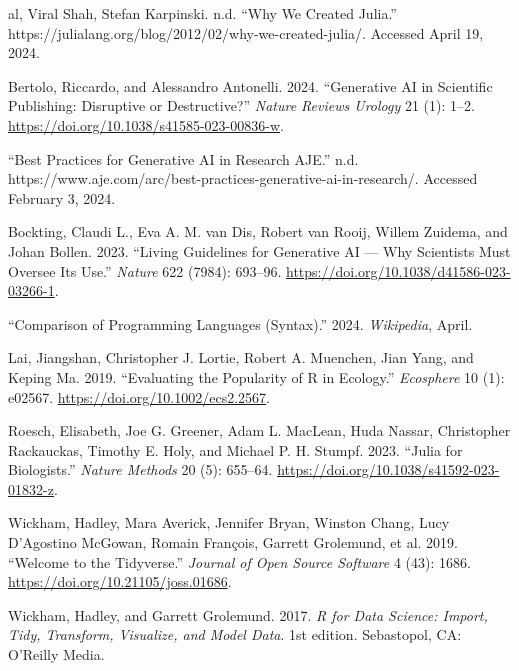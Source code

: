\documentclass[
  letterpaper,
]{krantz}
\newlength{\cslhangindent}
\newenvironment{CSLReferences}[2] %
 {\begin{list}{}{%
  \setlength{\itemindent}{0pt}
  \setlength{\leftmargin}{0pt}
  \setlength{\parsep}{0pt}
  \ifodd #1
   \setlength{\leftmargin}{\cslhangindent}
   \setlength{\itemindent}{-1\cslhangindent}
  \fi
  \setlength{\itemsep}{#2\baselineskip}}}
 {\end{list}}
\begin{document}
\label{refs}
\begin{CSLReferences}{1}{0}
al, Viral Shah, Stefan Karpinski. n.d. {``Why {We Created Julia}.''}
https://julialang.org/blog/2012/02/why-we-created-julia/. Accessed April
19, 2024.

Bertolo, Riccardo, and Alessandro Antonelli. 2024. {``Generative {AI} in
Scientific Publishing: Disruptive or Destructive?''} \emph{Nature
Reviews Urology} 21 (1): 1--2.
\url{https://doi.org/10.1038/s41585-023-00836-w}.

{``Best {Practices} for {Generative AI} in {Research} {\textbar}
{AJE}.''} n.d.
https://www.aje.com/arc/best-practices-generative-ai-in-research/.
Accessed February 3, 2024.

Bockting, Claudi L., Eva A. M. van Dis, Robert van Rooij, Willem
Zuidema, and Johan Bollen. 2023. {``Living Guidelines for Generative
{AI} --- Why Scientists Must Oversee Its Use.''} \emph{Nature} 622
(7984): 693--96. \url{https://doi.org/10.1038/d41586-023-03266-1}.

{``Comparison of Programming Languages (Syntax).''} 2024.
\emph{Wikipedia}, April.

Lai, Jiangshan, Christopher J. Lortie, Robert A. Muenchen, Jian Yang,
and Keping Ma. 2019. {``Evaluating the Popularity of {R} in Ecology.''}
\emph{Ecosphere} 10 (1): e02567.
\url{https://doi.org/10.1002/ecs2.2567}.

Roesch, Elisabeth, Joe G. Greener, Adam L. MacLean, Huda Nassar,
Christopher Rackauckas, Timothy E. Holy, and Michael P. H. Stumpf. 2023.
{``Julia for Biologists.''} \emph{Nature Methods} 20 (5): 655--64.
\url{https://doi.org/10.1038/s41592-023-01832-z}.

Wickham, Hadley, Mara Averick, Jennifer Bryan, Winston Chang, Lucy
D'Agostino McGowan, Romain François, Garrett Grolemund, et al. 2019.
{``Welcome to the Tidyverse.''} \emph{Journal of Open Source Software} 4
(43): 1686. \url{https://doi.org/10.21105/joss.01686}.

Wickham, Hadley, and Garrett Grolemund. 2017. \emph{R for {Data
Science}: {Import}, {Tidy}, {Transform}, {Visualize}, and {Model Data}}.
1st edition. Sebastopol, CA: O'Reilly Media.

\end{CSLReferences}



\backmatter
\printindex
\end{document}
